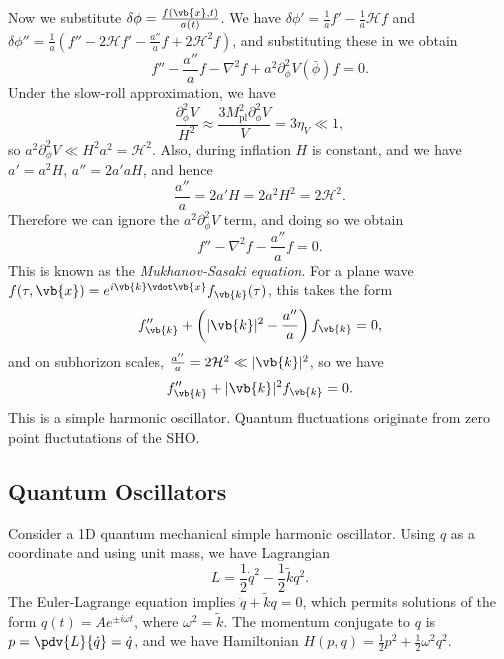 \documentclass{jknotes}
\begin{document}
Now we substitute \(\delta\phi = \frac{f(\vb{x},t)}{a(t)}\). We have \(\delta\phi' = \frac1a f'-\frac1a \mathcal{H}f\) and \(\delta\phi'' = \frac1a\left(f'' - 2\mathcal{H}f' - \frac{a''}{a}f + 2\mathcal{H}^2f\right)\), and substituting these in we obtain
\begin{equation}
    f'' - \frac{a''}a f - \nabla^2 f + a^2 \partial_\phi^2V(\bar\phi)f = 0.
\end{equation}
Under the slow-roll approximation, we have
\begin{equation}
    \frac{\partial_\phi^2 V}{H^2} \approx \frac{3M_{\text{pl}}^2\partial^2_{\phi}V}{V} = 3\eta_V \ll 1,
\end{equation}
so \(a^2\partial_\phi^2V \ll H^2a^2 = \mathcal{H}^2\).
Also, during inflation \(H\) is constant, and we have \(a' = a^2H\), \(a'' = 2 a'aH\), and hence
\begin{equation}
    \frac{a''}{a} = 2a'H = 2a^2H^2 = 2\mathcal{H}^2.
\end{equation}
Therefore we can ignore the \(a^2\partial^2_\phi V\) term, and doing so we obtain
\begin{equation}
    f'' - \nabla^2 f - \frac{a''}{a}f = 0.
\end{equation}
This is known as the \emph{Mukhanov-Sasaki equation}. For a plane wave \(f(\tau,\vb{x}) = e^{i\vb{k}\vdot\vb{x}}f_{\vb{k}}(\tau)\), this takes the form
\begin{equation}
    f_{\vb{k}}'' + \left(|\vb{k}|^2 - \frac{a''}{a}\right)f_{\vb{k}} = 0,
\end{equation}
and on subhorizon scales, \(\frac{a''}{a} = 2\mathcal{H}^2 \ll |\vb{k}|^2\), so we have
\begin{equation}
    f_{\vb{k}}'' + |\vb{k}|^2f_{\vb{k}} = 0.
\end{equation}
This is a simple harmonic oscillator. Quantum fluctuations originate from zero point fluctutations of the SHO.

\subsection{Quantum Oscillators}
Consider a 1D quantum mechanical simple harmonic oscillator. Using \(q\) as a coordinate and using unit mass, we have Lagrangian
\begin{equation}
    L = \frac12\dot{q}^2 - \frac12\tilde{k}q^2.
\end{equation}
The Euler-Lagrange equation implies \(\ddot{q} + \tilde{k}q = 0\), which permits solutions of the form \(q(t) = Ae^{\pm i\omega t}\), where \(\omega^2 = \tilde{k}\). The momentum conjugate to \(q\) is \(p = \pdv{L}{\dot{q}} = \dot{q}\), and we have Hamiltonian \(H(p,q) = \frac12p^2 + \frac12\omega^2q^2\).
\end{document}
